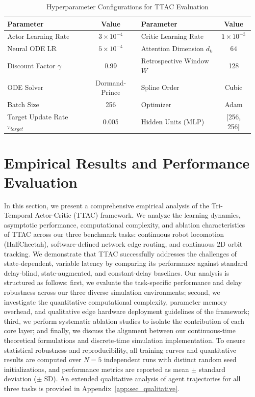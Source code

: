 \documentclass[manuscript, screen, review]{jair}
\begin{document}
\begin{table}[!htbp]
\centering
\caption{Hyperparameter Configurations for TTAC Evaluation}
\label{tab:hyperparams}
\vskip 0.1in
\begin{small}
\begin{tabular}{lc|lc}
\toprule
\textbf{Parameter} & \textbf{Value} & \textbf{Parameter} & \textbf{Value} \\
\midrule
Actor Learning Rate & $3 \times 10^{-4}$ & Critic Learning Rate & $1 \times 10^{-3}$ \\
Neural ODE LR & $5 \times 10^{-4}$ & Attention Dimension $d_k$ & 64 \\
Discount Factor $\gamma$ & 0.99 & Retrospective Window $W$ & 128 \\
ODE Solver & Dormand-Prince & Spline Order & Cubic \\
Batch Size & 256 & Optimizer & Adam \\
Target Update Rate $\tau_{target}$ & 0.005 & Hidden Units (MLP) & [256, 256] \\
\bottomrule
\end{tabular}
\end{small}
\end{table}

\section{Empirical Results and Performance Evaluation}
In this section, we present a comprehensive empirical analysis of the Tri-Temporal Actor-Critic (TTAC) framework. We analyze the learning dynamics, asymptotic performance, computational complexity, and ablation characteristics of TTAC across our three benchmark tasks: continuous robot locomotion (HalfCheetah), software-defined network edge routing, and continuous 2D orbit tracking. We demonstrate that TTAC successfully addresses the challenges of state-dependent, variable latency by comparing its performance against standard delay-blind, state-augmented, and constant-delay baselines. Our analysis is structured as follows: first, we evaluate the task-specific performance and delay robustness across our three diverse simulation environments; second, we investigate the quantitative computational complexity, parameter memory overhead, and qualitative edge hardware deployment guidelines of the framework; third, we perform systematic ablation studies to isolate the contribution of each core layer; and finally, we discuss the alignment between our continuous-time theoretical formulations and discrete-time simulation implementation. To ensure statistical robustness and reproducibility, all training curves and quantitative results are computed over $N=5$ independent runs with distinct random seed initializations, and performance metrics are reported as mean $\pm$ standard deviation ($\pm$ SD). An extended qualitative analysis of agent trajectories for all three tasks is provided in Appendix~\ref{app:sec_qualitative}.
\end{document}

